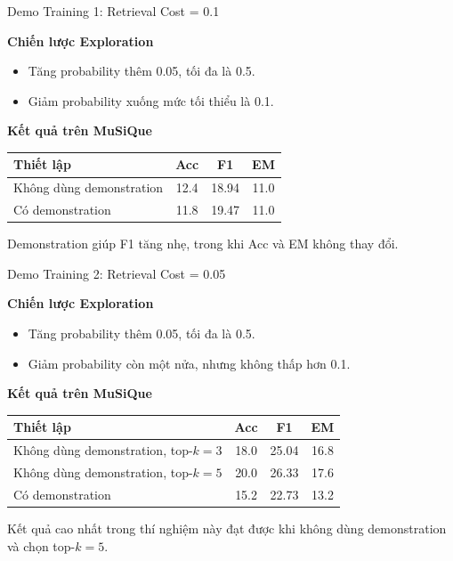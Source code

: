 \begin{frame}{Demo Training 1: Retrieval Cost = 0.1}

\textbf{Chiến lược Exploration}
\begin{itemize}
    \item Tăng probability thêm 0.05, tối đa là 0.5.
    \item Giảm probability xuống mức tối thiểu là 0.1.
\end{itemize}

\vspace{0.15cm}

\textbf{Kết quả trên MuSiQue}

\centering
\begin{tabular}{lccc}
    \hline
    \textbf{Thiết lập} & \textbf{Acc} & \textbf{F1} & \textbf{EM} \\
    \hline
    Không dùng demonstration & 12.4 & 18.94 & 11.0 \\
    Có demonstration & 11.8 & 19.47 & 11.0 \\
    \hline
\end{tabular}

\vspace{0.2cm}

\small
Demonstration giúp F1 tăng nhẹ, trong khi Acc và EM không thay đổi.

\end{frame}


\begin{frame}{Demo Training 2: Retrieval Cost = 0.05}

\textbf{Chiến lược Exploration}
\begin{itemize}
    \item Tăng probability thêm 0.05, tối đa là 0.5.
    \item Giảm probability còn một nửa, nhưng không thấp hơn 0.1.
\end{itemize}

\vspace{0.15cm}

\textbf{Kết quả trên MuSiQue}

\centering
\scriptsize
\begin{tabular}{lccc}
    \hline
    \textbf{Thiết lập} & \textbf{Acc} & \textbf{F1} & \textbf{EM} \\
    \hline
    Không dùng demonstration, top-$k=3$ & 18.0 & 25.04 & 16.8 \\
    Không dùng demonstration, top-$k=5$ & 20.0 & 26.33 & 17.6 \\
    Có demonstration & 15.2 & 22.73 & 13.2 \\
    \hline
\end{tabular}

\vspace{0.2cm}

\small
Kết quả cao nhất trong thí nghiệm này đạt được khi không dùng demonstration và chọn top-$k=5$.

\end{frame}


